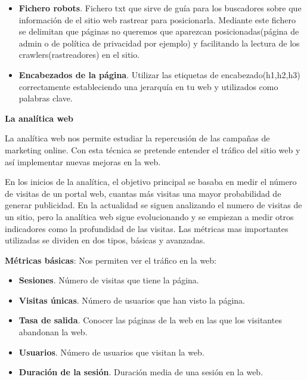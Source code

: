 \begin{itemize}
\item \textbf{Fichero robots}. Fichero txt que sirve de guía para los buscadores sobre que información de el sitio web rastrear para posicionarla. Mediante este fichero se delimitan que páginas no queremos que aparezcan posicionadas(página de admin o de política de privacidad por ejemplo) y facilitando la lectura de los crawlers(rastreadores) en el sitio.

\item \textbf{Encabezados de la página}. Utilizar las etiquetas de encabezado(h1,h2,h3) correctamente estableciendo una jerarquía en tu web y utilizados como palabras clave.  


\end{itemize}

\vspace{5 mm}

\textbf{La analítica web}

\vspace{5 mm}

La analítica web nos permite estudiar la repercusión de las campañas de marketing online. Con esta técnica se pretende entender el tráfico del sitio web y así implementar nuevas mejoras en la web.

\vspace{5 mm}

En los inicios de la analítica, el objetivo principal se basaba en medir el número de visitas de un portal web, cuantas más visitas una mayor probabilidad de generar publicidad. En la actualidad se siguen analizando el numero de visitas de un sitio, pero la analítica web sigue evolucionando y se empiezan a medir otros indicadores como la profundidad de las visitas. Las métricas mas importantes utilizadas se dividen en dos tipos, básicas y avanzadas.


\textbf{Métricas básicas}: Nos permiten ver el tráfico en la web: 

\begin{itemize}

\item \textbf{Sesiones}. Número de visitas que tiene la página.

\item \textbf{Visitas únicas}. Número de usuarios que han visto la página.

\item \textbf{Tasa de salida}. Conocer las páginas de la web en las que los visitantes abandonan la web.

\item \textbf{Usuarios}. Número de usuarios que visitan la web. 

\item \textbf{Duración de la sesión}. Duración media de una sesión en la web.

\end{itemize}

